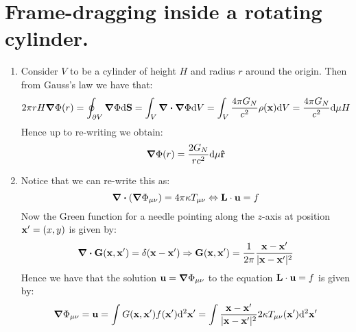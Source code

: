 \documentclass[10pt,a4paper]{article}
\begin{document}
\section{Frame-dragging inside a rotating cylinder.}

\begin{enumerate}

\item Consider $V$ to be a cylinder of height $H$ and radius $r$ around the origin. Then from Gauss's law we have that:
\[
2 \pi r H \grad \Phi(r) = \oint_{\partial V} \grad \Phi \dd \vb{S} = \int_V \div \grad \Phi \dd V = \int_V \frac{4 \pi G_N}{c^2} \rho(\vb{x}) \dd V = \frac{4\pi G_N}{c^2} \dd \mu H  
\]
Hence up to re-writing we obtain:
\[
\grad \Phi(r) = \frac{2 G_N}{r c^2} \dd \mu \vu{r}
\]

\item Notice that we can re-write this as:
\[
\div (\grad \Phi_{\mu\nu}) = 4 \pi \kappa T_{\mu \nu} \Leftrightarrow \vb{L} \cdot \vb{u} = f
\]
Now the Green function for a needle pointing along the $z$-axis at position $\vb{x'} = (x, y)$ is given by:
\[
\div \vb{G(\vb{x}, \vb{x'})} = \delta(\vb{x} - \vb{x'}) \Rightarrow \vb{G}(\vb{x}, \vb{x'}) = \frac{1}{2\pi} \frac{\vb{x} - \vb{x'}}{|\vb{x} - \vb{x'}|^2}
\]
Hence we have that the solution $\vb{u} = \grad\Phi_{\mu\nu}$ to the equation $\vb{L} \cdot \vb{u} = f$ is given by:
\[
\grad \Phi_{\mu\nu} = \vb{u} = \int G(\vb{x}, \vb{x'}) f(\vb{x'}) \dd^2 \vb{x'} = \int \frac{\vb{x} - \vb{x'}}{|\vb{x} - \vb{x'}|^2} 2 \kappa T_{\mu\nu}(\vb{x'}) \dd^2 \vb{x'} 
\]


\end{enumerate}
\end{document}
